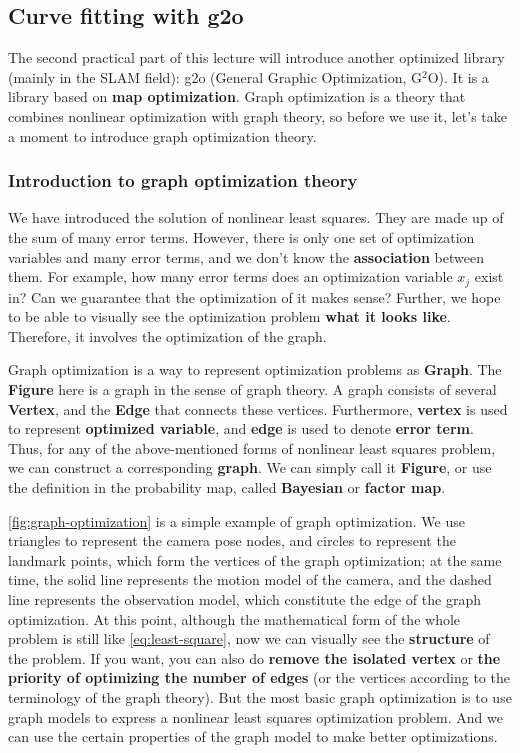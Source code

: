 \subsection{Curve fitting with g2o}

The second practical part of this lecture will introduce another optimized library (mainly in the SLAM field): g2o (General Graphic Optimization, G$^2$O). It is a library based on \textbf{map optimization}. Graph optimization is a theory that combines nonlinear optimization with graph theory, so before we use it, let's take a moment to introduce graph optimization theory.

\subsubsection{Introduction to graph optimization theory}
We have introduced the solution of nonlinear least squares. They are made up of the sum of many error terms. However, there is only one set of optimization variables and many error terms, and we don't know the \textbf{association} between them. For example, how many error terms does an optimization variable $x_j$ exist in? Can we guarantee that the optimization of it makes sense? Further, we hope to be able to visually see the optimization problem \textbf{what it looks like}. Therefore, it involves the optimization of the graph.

Graph optimization is a way to represent optimization problems as \textbf{Graph}. The \textbf{Figure} here is a graph in the sense of graph theory. A graph consists of several \textbf{Vertex}, and the \textbf{Edge} that connects these vertices. Furthermore, \textbf{vertex} is used to represent \textbf{optimized variable}, and \textbf{edge} is used to denote \textbf{error term}. Thus, for any of the above-mentioned forms of nonlinear least squares problem, we can construct a corresponding \textbf{graph}. We can simply call it \textbf{Figure}, or use the definition in the probability map, called \textbf{Bayesian} or \textbf{factor map}.

\autoref{fig:graph-optimization} is a simple example of graph optimization. We use triangles to represent the camera pose nodes, and circles to represent the landmark points, which form the vertices of the graph optimization; at the same time, the solid line represents the motion model of the camera, and the dashed line represents the observation model, which constitute the edge of the graph optimization.  At this point, although the mathematical form of the whole problem is still like \eqref{eq:least-square}, now we can visually see the \textbf{structure} of the problem.  If you want, you can also do \textbf{remove the isolated vertex} or \textbf{the priority of optimizing the number of edges} (or the vertices according to the terminology of the graph theory).  But the most basic graph optimization is to use graph models to express a nonlinear least squares optimization problem. And we can use the certain properties of the graph model to make better optimizations.
	
